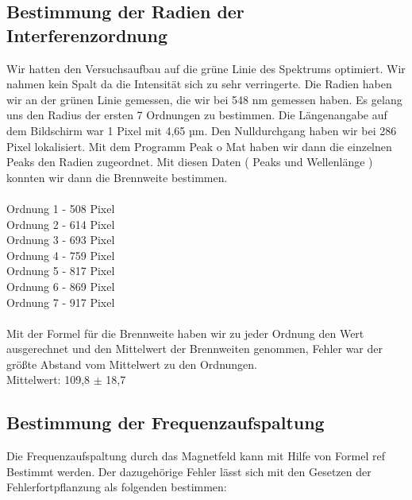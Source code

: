 \documentclass[10pt,a4paper]{article}
\begin{document}
\subsection {Bestimmung der Radien der Interferenzordnung}

Wir hatten den Versuchsaufbau auf die grüne Linie des Spektrums optimiert. Wir nahmen kein Spalt da die Intensität sich zu sehr verringerte. Die Radien haben wir an der grünen Linie gemessen, die wir bei 548 nm gemessen haben. Es gelang uns den Radius der ersten 7 Ordnungen zu bestimmen. Die Längenangabe auf dem Bildschirm war 1 Pixel mit 4,65 µm. Den Nulldurchgang haben wir bei 286 Pixel lokalisiert. Mit dem Programm Peak o Mat haben wir dann die einzelnen Peaks den Radien zugeordnet. Mit diesen Daten ( Peaks und Wellenlänge ) konnten wir dann die Brennweite bestimmen.\\
\\
Ordnung 1 - 508 Pixel\\
Ordnung 2 - 614 Pixel\\
Ordnung 3 - 693 Pixel\\
Ordnung 4 - 759 Pixel\\
Ordnung 5 - 817 Pixel\\
Ordnung 6 - 869 Pixel\\
Ordnung 7 - 917 Pixel\\
\\
Mit der Formel für die Brennweite haben wir zu jeder Ordnung den Wert ausgerechnet und den Mittelwert der Brennweiten genommen, Fehler war der größte Abstand vom Mittelwert zu den Ordnungen. \\
Mittelwert: 109,8 $\pm$ 18,7


\subsection{Bestimmung der Frequenzaufspaltung}

Die Frequenzaufspaltung durch das Magnetfeld kann mit Hilfe von Formel ref Bestimmt werden. Der dazugehörige Fehler lässt sich mit den Gesetzen der Fehlerfortpflanzung als folgenden bestimmen:
\end{document}
